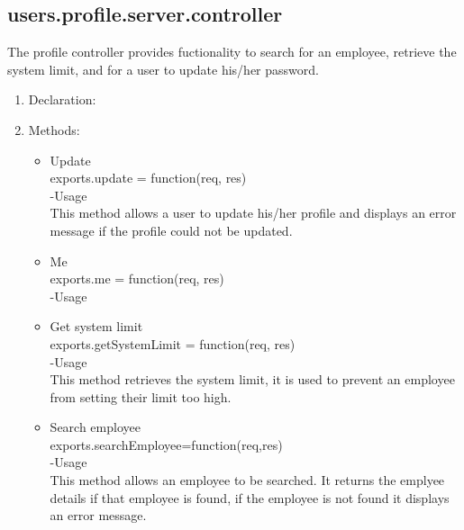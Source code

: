 \documentclass[a4paper,12pt]{article}
\begin{document}
\subsection{users.profile.server.controller}
 The profile controller provides fuctionality to search for an employee, retrieve the system limit, and for a user to update his/her password.
 \begin{enumerate}
 \item Declaration:\\
 \item Methods:
 	\begin{itemize}
 		\item Update\\
 		exports.update = function(req, res)\\
 		-Usage\\
 		This method allows a user to update his/her profile and displays an error message if the profile could not be updated.
		 \item Me\\
 		exports.me = function(req, res)\\
 		-Usage\\
 
 		\item Get system limit\\
 		exports.getSystemLimit = function(req, res)\\
 		-Usage\\
		 This method retrieves the system limit, it is used to prevent an employee from setting their limit too high.
 		\item Search employee\\
 		exports.searchEmployee=function(req,res)\\
 		-Usage\\
		 This method allows an employee to be searched. It returns the emplyee details if that employee is found, if the employee is not found it displays an error message.
 	\end{itemize}
 \end{enumerate}
\end{document}
